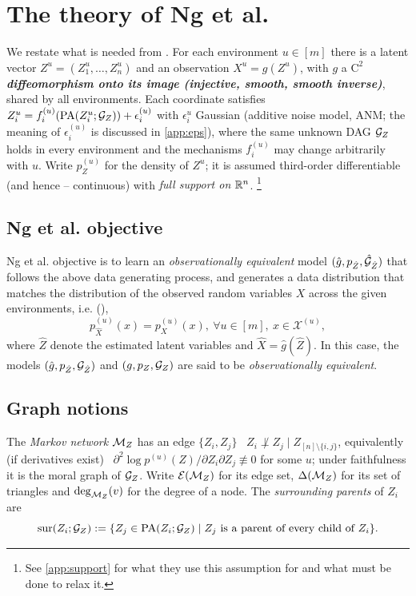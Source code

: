 \section{The theory of Ng et al.}
\label{sec:ng}

We restate what is needed from \cite{ng2025}. For each environment $u\in[m]$ there is a latent vector
$Z^u=(Z_1^u,\dots,Z_n^u)$ and an observation $X^u=g(Z^u)$, with $g$ a $\mathrm{C}^2$ 
\textbf{\textit{diffeomorphism onto its image (injective, smooth, smooth inverse)}}, shared by all environments. Each coordinate satisfies
$Z_i^u=f_i^{(u)}(\mathrm{PA}(Z_i^u;\mathcal{G}_Z))+\epsilon_i^{(u)}$ with $\epsilon_i^u$ Gaussian (additive noise
model, ANM; the meaning of $\epsilon_i^{(u)}$ is discussed in \cref{app:eps}), where the same unknown
DAG $\mathcal{G}_Z$ holds in every environment and the mechanisms $f_i^{(u)}$ may change arbitrarily with
$u$. Write $p^{(u)}_Z$ for the density of $Z^u$; it is assumed third-order differentiable (and hence 
--  continuous) with \emph{full support on $\mathbb{R}^{n}$}.
\footnote{See \cref{app:support} for what they use this assumption for and what must be done
to relax it.}

\subsection{Ng et al. objective}
Ng et al. objective is to learn an \textit{observationally equivalent} model 
$(\hat g, p_{\hat Z}, \hat {\mathcal{G}}_{\hat Z})$
that follows the above data generating process, and generates a data distribution that matches the 
distribution of the observed random variables $X$ across the given environments, i.e. 
(\cite[Equation 2]{ng2025}), 
\begin{equation}
p^{(u)}_{\hat X}(x) = p^{(u)}_X(x),\ \forall u \in [m],\ x \in \mathcal{X}^{(u)},
\label{eq:obs_equiv}
\end{equation}
where $\hat Z$ denote the estimated latent variables and $\hat X = \hat{g}(\hat Z)$. In this case, 
the models $(\hat g, p_{\hat Z}, \mathcal{G}_{\hat Z})$ and $(g, p_Z, \mathcal{G}_Z)$ are said to be 
\textit{observationally equivalent}.

\subsection{Graph notions}
The \emph{Markov network} $\mathcal{M}_Z$ has an edge $\{Z_i,Z_j\}$ \ifft \ 
$Z_i\not\perp Z_j\mid Z_{[n]\setminus\{i,j\}}$, equivalently (if derivatives exist) \ifft\ 
$\partial^2\log p^{(u)}(Z)/\partial Z_i\partial Z_j\not\equiv0$ for some $u$; under faithfulness it 
is the moral graph of $\mathcal{G}_Z$. Write $\mathcal{E}(\mathcal{M}_Z)$ for its edge set, $\Delta(\mathcal{M}_Z)$ for its 
set of triangles and $\deg_{\mathcal{M}_Z}(v)$ for the degree of a node. 
The \emph{surrounding parents} of $Z_i$ are
\[
\mathrm{sur}(Z_i;\mathcal{G}_Z):=\{Z_j\in\mathrm{PA}(Z_i;\mathcal{G}_Z)\mid Z_j\text{ is a parent of every child of }Z_i\}.
\]

